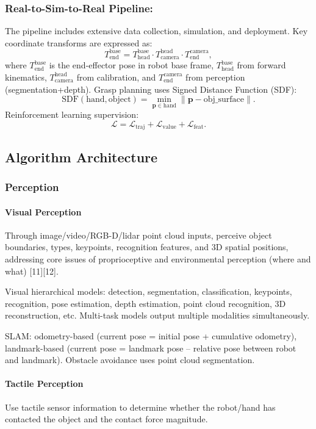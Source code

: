 \documentclass[12pt,a4paper]{article}
\begin{document}
\subsubsection{Real-to-Sim-to-Real Pipeline:}
The pipeline includes extensive data collection, simulation, and deployment. Key coordinate transforms are expressed as:
\[
T_{\text{end}}^{\text{base}} = T_{\text{head}}^{\text{base}} \cdot T_{\text{camera}}^{\text{head}} \cdot T_{\text{end}}^{\text{camera}},
\]
where $T_{\text{end}}^{\text{base}}$ is the end-effector pose in robot base frame, $T_{\text{head}}^{\text{base}}$ from forward kinematics, $T_{\text{camera}}^{\text{head}}$ from calibration, and $T_{\text{end}}^{\text{camera}}$ from perception (segmentation+depth). Grasp planning uses Signed Distance Function (SDF):
\[
\text{SDF}(\text{hand}, \text{object}) = \min_{\mathbf{p} \in \text{hand}} \| \mathbf{p} - \text{obj\_surface} \|.
\]
Reinforcement learning supervision:
\[
\mathcal{L} = \mathcal{L}_{\text{traj}} + \mathcal{L}_{\text{value}} + \mathcal{L}_{\text{feat}}.
\]

\subsection{Algorithm Architecture}
\subsubsection{Perception}
\paragraph{Visual Perception}
Through image/video/RGB-D/lidar point cloud inputs, perceive object boundaries, types, keypoints, recognition features, and 3D spatial positions, addressing core issues of proprioceptive and environmental perception (where and what) [11][12].

Visual hierarchical models: detection, segmentation, classification, keypoints, recognition, pose estimation, depth estimation, point cloud recognition, 3D reconstruction, etc. Multi-task models output multiple modalities simultaneously.

SLAM: odometry-based (current pose = initial pose + cumulative odometry), landmark-based (current pose = landmark pose – relative pose between robot and landmark). Obstacle avoidance uses point cloud segmentation.

\paragraph{Tactile Perception}
Use tactile sensor information to determine whether the robot/hand has contacted the object and the contact force magnitude.
\end{document}
